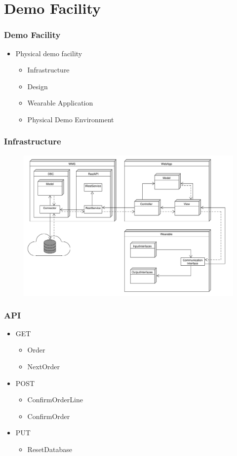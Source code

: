 \section{Demo Facility}
\begin{frame}\frametitle{Demo Facility}
	\begin{itemize}
		\item Physical demo facility
		\begin{itemize}
			\item Infrastructure
			\item Design
			\item Wearable Application
			\item Physical Demo Environment
		\end{itemize}
	\end{itemize}
\end{frame}
\begin{frame}\frametitle{Infrastructure}
\begin{figure}
	\includegraphics[width=\textwidth]{images/ClassDiagram_Level1}
\end{figure}
\end{frame}
\begin{frame}\frametitle{API}
	\begin{itemize}
		\item GET
		\begin{itemize}
			\item Order
			\item NextOrder
		\end{itemize}
		\item POST
		\begin{itemize}
			\item ConfirmOrderLine
			\item ConfirmOrder
		\end{itemize}
		\item PUT
		\begin{itemize}
			\item ResetDatabase
		\end{itemize}
	\end{itemize}
\end{frame}
